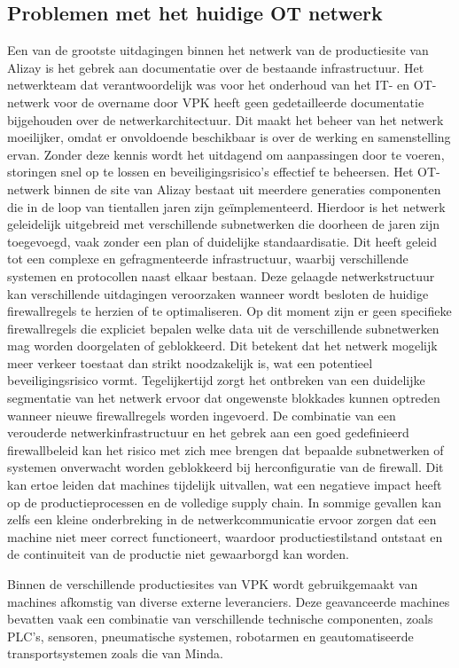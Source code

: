 \subsection{Problemen met het huidige OT netwerk}
Een van de grootste uitdagingen binnen het netwerk van de productiesite van Alizay is het gebrek aan documentatie over de bestaande infrastructuur. Het netwerkteam dat verantwoordelijk was voor het onderhoud van het IT- en OT-netwerk voor de overname door VPK heeft geen gedetailleerde documentatie bijgehouden over de netwerkarchitectuur. Dit maakt het beheer van het netwerk moeilijker, omdat er onvoldoende beschikbaar is over de werking en samenstelling ervan. Zonder deze kennis wordt het uitdagend om aanpassingen door te voeren, storingen snel op te lossen en beveiligingsrisico’s effectief te beheersen.
Het OT-netwerk binnen de site van Alizay bestaat uit meerdere generaties componenten die in de loop van tientallen jaren zijn geïmplementeerd. Hierdoor is het netwerk geleidelijk uitgebreid met verschillende subnetwerken die doorheen de jaren zijn toegevoegd, vaak zonder een plan of duidelijke standaardisatie. Dit heeft geleid tot een complexe en gefragmenteerde infrastructuur, waarbij verschillende systemen en protocollen naast elkaar bestaan.
Deze gelaagde netwerkstructuur kan verschillende uitdagingen veroorzaken wanneer wordt besloten de huidige firewallregels te herzien of te optimaliseren. Op dit moment zijn er geen specifieke firewallregels die expliciet bepalen welke data uit de verschillende subnetwerken mag worden doorgelaten of geblokkeerd. Dit betekent dat het netwerk mogelijk meer verkeer toestaat dan strikt noodzakelijk is, wat een potentieel beveiligingsrisico vormt. Tegelijkertijd zorgt het ontbreken van een duidelijke segmentatie van het netwerk ervoor dat ongewenste blokkades kunnen optreden wanneer nieuwe firewallregels worden ingevoerd.
De combinatie van een verouderde netwerkinfrastructuur en het gebrek aan een goed gedefinieerd firewallbeleid kan het risico met zich mee brengen dat bepaalde subnetwerken of systemen onverwacht worden geblokkeerd bij herconfiguratie van de firewall. Dit kan ertoe leiden dat machines tijdelijk uitvallen, wat een negatieve impact heeft op de productieprocessen en de volledige supply chain. In sommige gevallen kan zelfs een kleine onderbreking in de netwerkcommunicatie ervoor zorgen dat een machine niet meer correct functioneert, waardoor productiestilstand ontstaat en de continuiteit van de productie niet gewaarborgd kan worden.

Binnen de verschillende productiesites van VPK wordt gebruikgemaakt van machines afkomstig van diverse externe leveranciers. Deze geavanceerde machines bevatten vaak een combinatie van verschillende technische componenten, zoals PLC’s, sensoren, pneumatische systemen, robotarmen en geautomatiseerde transportsystemen zoals die van Minda. 

